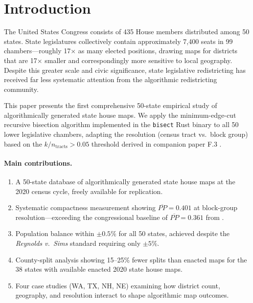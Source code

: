 \section{Introduction}
\label{sec:intro}

The United States Congress consists of 435 House members distributed among
50 states. State legislatures collectively contain approximately 7,400 seats
in 99 chambers---roughly 17$\times$ as many elected positions, drawing maps
for districts that are 17$\times$ smaller and correspondingly more sensitive
to local geography. Despite this greater scale and civic significance, state
legislative redistricting has received far less systematic attention from the
algorithmic redistricting community.

This paper presents the first comprehensive 50-state empirical study of
algorithmically generated state house maps. We apply the minimum-edge-cut
recursive bisection algorithm implemented in the \texttt{bisect} Rust binary
\citep{dellaLibera2026recursive} to all 50 lower legislative chambers,
adapting the resolution (census tract vs.\ block group) based on the
$k/n_{\mathrm{tracts}} > 0.05$ threshold derived in companion paper F.3
\citep{dellaLibera2026stateLegResolution}.

\paragraph{Main contributions.}
\begin{enumerate}
  \item A 50-state database of algorithmically generated state house maps
    at the 2020 census cycle, freely available for replication.
  \item Systematic compactness measurement showing $\overline{PP} = 0.401$
    at block-group resolution---exceeding the congressional baseline of
    $\overline{PP} = 0.361$ from \citet{dellaLibera2026mec}.
  \item Population balance within $\pm 0.5\%$ for all 50 states, achieved
    despite the \emph{Reynolds v.\ Sims} standard requiring only $\pm 5\%$.
  \item County-split analysis showing 15--25\% fewer splits than enacted maps
    for the 38 states with available enacted 2020 state house maps.
  \item Four case studies (WA, TX, NH, NE) examining how district count,
    geography, and resolution interact to shape algorithmic map outcomes.
\end{enumerate}

